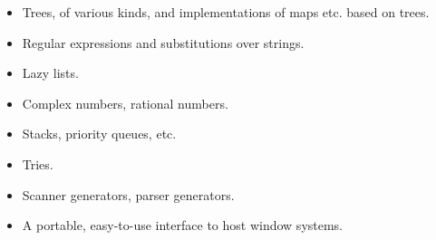 \begin{itemize}
  \item Trees, of various kinds, and implementations of maps etc. based
on trees.

  \item Regular expressions and substitutions over strings.

  \item Lazy lists.

  \item Complex numbers, rational numbers.

  \item Stacks, priority queues, etc.

  \item Tries.

  \item Scanner generators, parser generators.

  \item A portable, easy-to-use interface to host window systems.
\end{itemize}
